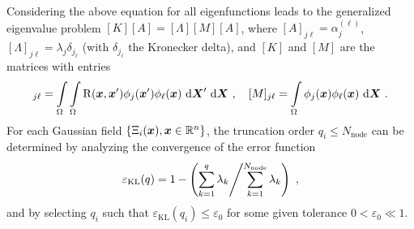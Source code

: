Considering the above equation for all eigenfunctions leads to the generalized eigenvalue problem $[K] [A] = [\Lambda] [M] [A]$, where $[A]_{j\ell} = \alpha_j^{(\ell)}$, $[\Lambda]_{j\ell} = \lambda_j \delta_{j_\ell}$ (with $\delta_{j_\ell}$ the Kronecker delta), and $[K]$ and $[M]$ are the matrices with entries
\begin{align}
  [K]_{j\ell} = \int\limits_\body \int\limits_\body \cor(\bs{x},\bs{x}') \phi_j(\bs{x}')\phi_\ell(\bs{x}) \diff{\bfX}' \diff{\bfX}~, \quad [M]_{j\ell} = \int\limits_\body \phi_j(\bs{x})\phi_\ell(\bs{x}) \diff{\bfX}~.
\end{align}
For each Gaussian field $\{\Xi_i(\boldsymbol{x}), \boldsymbol{x} \in \mathbb{R}^n\}$, the truncation order $q_i \leqslant N_{\text{node}}$ can be determined by analyzing the convergence of the error function
\begin{align}
  \varepsilon_{\text{KL}}(q) = 1-\left( \sum\limits_{k=1}^q \lambda_k \middle/ \sum\limits_{k=1}^{N_\text{node}} \lambda_k \right)~, \label{eq: truncation}
\end{align}
and by selecting $q_i$ such that $\varepsilon_{\text{KL}}(q_i) \leqslant \varepsilon_0$ for some given tolerance $0 < \varepsilon_0 \ll 1$.
